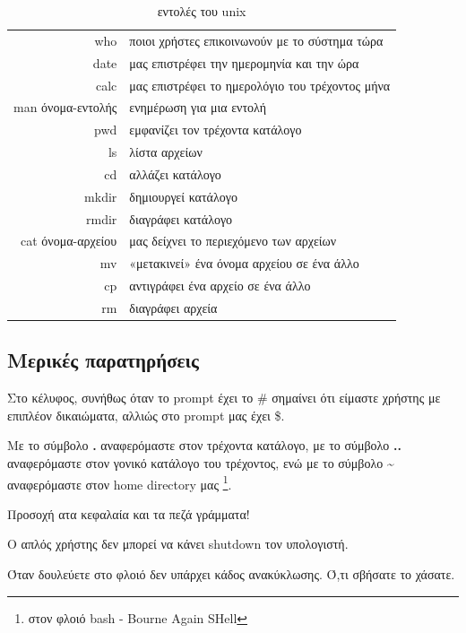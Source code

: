 \begin{center}
\begin{table}[h]
\begin{tabular}{ r | l }
who  & ποιοι χρήστες επικοινωνούν με το σύστημα τώρα  \\
date & μας επιστρέφει την ημερομηνία και την ώρα  \\
calc & μας επιστρέφει το ημερολόγιο του τρέχοντος μήνα \\
man όνομα-εντολής & ενημέρωση για μια εντολή \\  
pwd  & εμφανίζει τον τρέχοντα κατάλογο \\
ls & λίστα αρχείων \\
cd   & αλλάζει κατάλογο \\  
mkdir & δημιουργεί κατάλογο \\
rmdir & διαγράφει κατάλογο \\  
cat όνομα-αρχείου & μας δείχνει το περιεχόμενο των αρχείων \\
mv & «μετακινεί» ένα όνομα αρχείου σε ένα άλλο \\
cp & αντιγράφει ένα αρχείο σε ένα άλλο \\
rm & διαγράφει αρχεία \\
\end{tabular}  
\caption{εντολές του unix} 
\label{tab:cmd}          
\end{table}
\end{center}


\subsection{Μερικές παρατηρήσεις}


\begin{packed_item}
  \item Στο κέλυφος, συνήθως όταν το prompt έχει το \# σημαίνει ότι είμαστε χρήστης με επιπλέον δικαιώματα, αλλιώς στο prompt μας έχει \$.
  \item Με το σύμβολο \textbf{.} αναφερόμαστε στον τρέχοντα κατάλογο, με το σύμβολο \textbf{..} αναφερόμαστε στον γονικό κατάλογο του τρέχοντος, ενώ με το σύμβολο \space \textbf{\textasciitilde} \space αναφερόμαστε στον home directory μας \footnote{στον φλοιό bash - Bourne Again SHell }. 
  \item Προσοχή ατα κεφαλαία και τα πεζά γράμματα!   
  \item Ο απλός χρήστης δεν μπορεί να κάνει shutdown τον υπολογιστή.
  \item Όταν δουλεύετε στο φλοιό δεν υπάρχει κάδος ανακύκλωσης. Ό,τι σβήσατε το χάσατε.                    
\end{packed_item}


